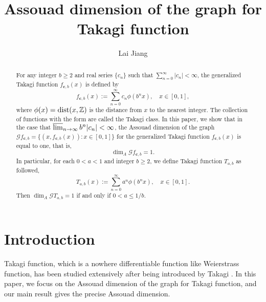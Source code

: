 \documentclass{amsart}
\theoremstyle{definition}
\theoremstyle{remark}
\numberwithin{equation}{section}
\newcommand{\dist}{{\rm dist}}
\begin{document}
\title[Assouad dimension of the graph for Takagi function]{Assouad dimension of the graph for Takagi function}



\author{Lai Jiang}
\address{School of Fundamental Physics and Mathematical Sciences, Hangzhou Institute for Advanced Study, University of Chinese Academy of Sciences, Hangzhou 310024, China}






\date{}




\begin{abstract}
For any integer $b\geq2$ and real series $\{c_n\}$ such that $\sum_{n=0}^\infty|c_n|<\infty$, the generalized Takagi function $f_{{\mathbf c},b}(x)$ is defined by
$$
	f_{{\mathbf c},b}(x):=\sum_{n=0}^\infty  c_n\phi(b^n x), \quad x\in [0,1],
$$
where $\phi(x)=\dist(x,\mathbb{Z})$ is the distance from $x$ to the nearest integer. 
The collection of functions with the form are called the Takagi class.
In this paper, we show that in the case that $\varlimsup_{n \to \infty} b^n |c_n|<\infty$, the Assouad dimension of the graph ${\mathcal G} f_{{\mathbf c},b}=\{(x,f_{{\mathbf c},b}(x)):x\in[0,1]\}$ for the generalized Takagi function $f_{{\mathbf c},b}(x)$ is equal to one, that is,
$$
\dim_A {\mathcal G} f_{{\mathbf c},b}=1.
$$
In particular, for each $0<a<1$ and integer $b \geq 2$, we define Takagi function $T_{a,b}$ as followed,
$$
	T_{a,b}(x):=\sum_{n=0}^\infty a^n \phi(b^n x),  \quad x\in [0,1].
$$
Then
$
	\dim_A {\mathcal G} T_{a,b}=1
$ 
if and only if $0<a \leq 1/b$.

\end{abstract}


\maketitle


\section{Introduction}
Takagi function, which is a nowhere differentiable function like Weierstrass function, has been studied extensively after being introduced by Takagi \cite{T1903}. In this paper, we focus on the Assouad dimension of the graph for Takagi function, and our main result gives the precise Assouad dimension.
\end{document}

